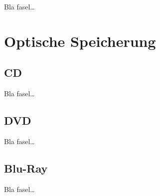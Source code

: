             Bla fasel\ldots
    
    \section{Optische Speicherung}
    \label{ch:Technisch:sec:Optische Speicherung}
        \subsection{CD}
        \label{ch:Technisch:sec:Optische Speicherung:sub:CD}
        
            Bla fasel\ldots
        
        \subsection{DVD}
        \label{ch:Technisch:sec:Optische Speicherung:sub:DVD}
        
            Bla fasel\ldots
        
        \subsection{Blu-Ray}
        \label{ch:Technisch:sec:Optische Speicherung:sub:Blu-Ray}
        
            Bla fasel\ldots

